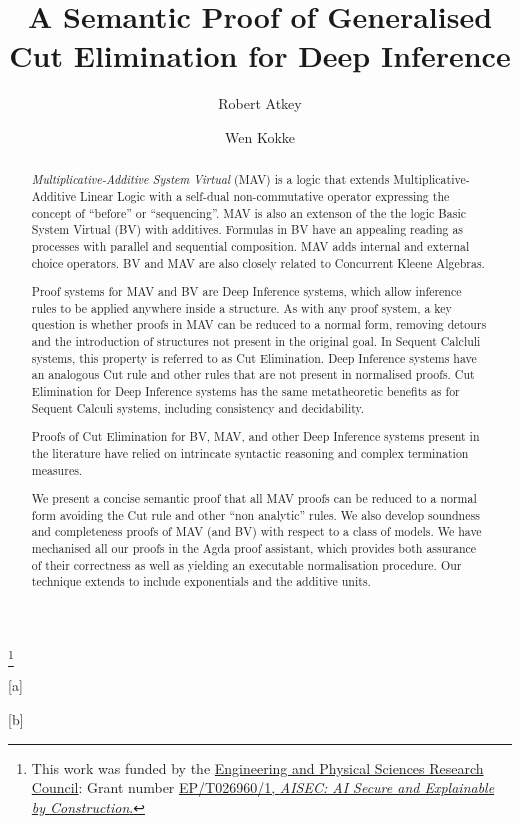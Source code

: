 \documentclass{lmcs}
\begin{document}
\title{A Semantic Proof of Generalised Cut Elimination for Deep Inference}
\thanks{This work was funded by the
  \href{https://www.ukri.org/about-us/epsrc/}{Engineering and Physical
    Sciences Research Council}: Grant number
  \href{https://gow.epsrc.ukri.org/NGBOViewGrant.aspx?GrantRef=EP/T026960/1}{EP/T026960/1,
    \emph{AISEC: AI Secure and Explainable by Construction}.}}

\author[R. Atkey]{Robert Atkey}[a]
\author[W. Kokke]{Wen Kokke}[b]

\address{Mathematically Structured Programming Group\\
  Computer and Information Sciences\\
  University of Strathclyde\\
  Glasgow, Scotland, UK}

\address{}

\begin{abstract}
  \emph{Multiplicative-Additive System Virtual} (MAV) is a logic that
  extends Multiplicative-Additive Linear Logic with a self-dual
  non-commutative operator expressing the concept of ``before'' or
  ``sequencing''. MAV is also an extenson of the the logic Basic
  System Virtual (BV) with additives. Formulas in BV have an appealing
  reading as processes with parallel and sequential composition. MAV
  adds internal and external choice operators. BV and MAV are also
  closely related to Concurrent Kleene Algebras.

  Proof systems for MAV and BV are Deep Inference systems, which allow
  inference rules to be applied anywhere inside a structure. As with
  any proof system, a key question is whether proofs in MAV can be
  reduced to a normal form, removing detours and the introduction of
  structures not present in the original goal. In Sequent Calcluli
  systems, this property is referred to as Cut Elimination. Deep
  Inference systems have an analogous Cut rule and other rules that
  are not present in normalised proofs. Cut Elimination for Deep
  Inference systems has the same metatheoretic benefits as for Sequent
  Calculi systems, including consistency and decidability.

  Proofs of Cut Elimination for BV, MAV, and other Deep Inference
  systems present in the literature have relied on intrincate
  syntactic reasoning and complex termination measures.

  We present a concise semantic proof that all MAV proofs can be
  reduced to a normal form avoiding the Cut rule and other ``non
  analytic'' rules. We also develop soundness and completeness proofs
  of MAV (and BV) with respect to a class of models. We have
  mechanised all our proofs in the Agda proof assistant, which
  provides both assurance of their correctness as well as yielding an
  executable normalisation procedure. Our technique extends to include
  exponentials and the additive units.
\end{abstract}
\end{document}
